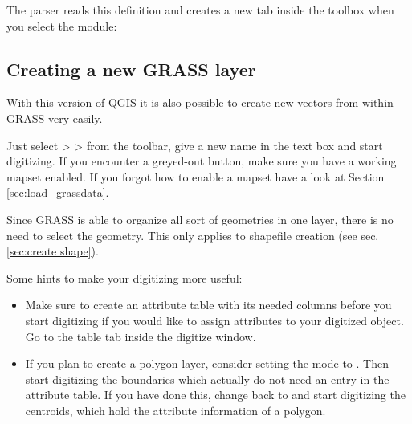 
The parser reads this definition and creates a new tab inside the toolbox when you select 
the module:


\subsection{Creating a new GRASS layer}\label{sec:creating_new_grass_vectors}

With this version of QGIS it is also possible to create new vectors from within GRASS very
easily.

Just select  >  > 
 from the toolbar, give a new name in the text box and start digitizing.
If you encounter a greyed-out button, make sure you have a working mapset enabled. If you forgot
how to enable a mapset have a look at Section \ref{sec:load_grassdata}.

Since GRASS is able to organize all sort of geometries in one layer, there is no need to select
the geometry. This only applies to shapefile creation (see sec. \ref{sec:create shape}).

Some hints to make your digitizing more useful:
\begin{itemize}
\item Make sure to create an attribute table with its needed columns before you start digitizing
if you would like to assign attributes to your digitized object. 
Go to the table tab inside the digitize window.
\item If you plan to create a polygon layer, consider setting the mode to . 
Then start digitizing the boundaries which actually do not need an entry in the attribute table. 
If you have done this, change back to  and start digitizing the centroids, which 
hold the attribute information of a polygon.

\end{itemize}

